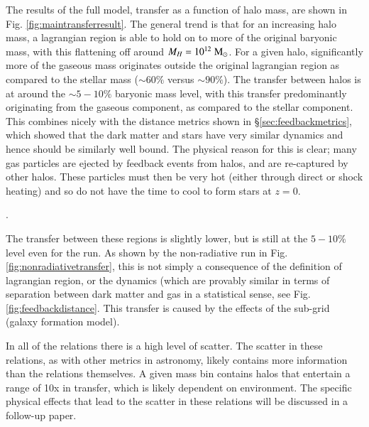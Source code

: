 The results of the full model, transfer as a function of halo mass, are shown in Fig.
\ref{fig:maintransferresult}. The general trend is that for an increasing halo mass,
a lagrangian region is able to hold on to more of the original baryonic mass, with
this flattening off around $M_H = 10^{12} \;{\rm M}_{\odot}$. For a given halo, significantly
more of the gaseous mass originates outside the original lagrangian region as compared
to the stellar mass ($\sim 60 \%$ versus $\sim 90 \%$). The transfer between halos is
at around the $\sim 5-10\%$ baryonic mass level, with this transfer predominantly
originating from the gaseous component, as compared to the stellar component. This combines
nicely with the distance metrics shown in \S \ref{sec:feedbackmetrics}, which
showed that the dark matter and stars have very similar dynamics and hence should be
similarly well bound. The physical reason for this is clear; many gas particles are ejected
by feedback events from halos, and are re-captured by other halos. These particles must then
be very hot (either through direct or shock heating) and so do not have the time to cool to
form stars at $z=0$.

.


The transfer between these regions is slightly lower, but is still at the
$5-10\%$ level even for the \nojet{} run. As shown by the non-radiative run
in Fig. \ref{fig:nonradiativetransfer}, this is not simply a consequence of
the definition of lagrangian region, or the dynamics (which are provably
similar in terms of separation between dark matter and gas in a statistical
sense, see Fig. \ref{fig:feedbackdistance}. This transfer is caused by the
effects of the sub-grid (galaxy formation model).

In all of the relations there is a high level of scatter. The scatter in these
relations, as with other metrics in astronomy, likely contains more information 
than the relations themselves. A given mass bin contains halos that entertain a range
of 10x in transfer, which is likely dependent on environment. The specific physical
effects that lead to the scatter in these relations will be discussed in a follow-up
paper.


